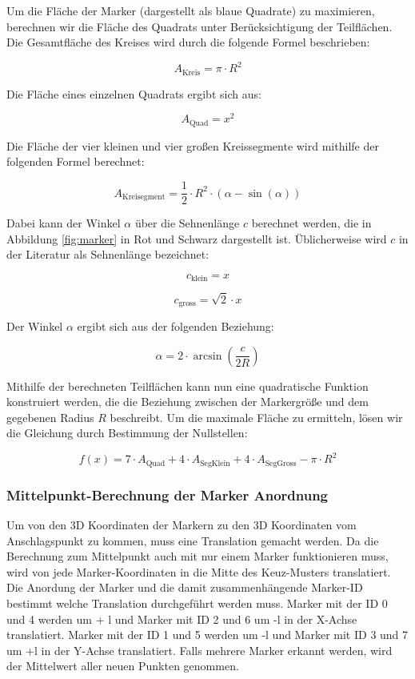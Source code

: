 Um die Fläche der Marker (dargestellt als blaue Quadrate) zu maximieren, berechnen wir die Fläche des Quadrats unter Berücksichtigung der Teilflächen. Die Gesamtfläche des Kreises wird durch die folgende Formel beschrieben:

\[
A_\text{Kreis} = \pi \cdot R^2
\]

Die Fläche eines einzelnen Quadrats ergibt sich aus:

\[
A_{\text{Quad}} = x^2
\]

Die Fläche der vier kleinen und vier großen Kreissegmente wird mithilfe der folgenden Formel berechnet:

\[
A_\text{Kreisegment} = \frac{1}{2} \cdot R^2 \cdot (\alpha - \sin(\alpha))
\]

Dabei kann der Winkel \(\alpha\) über die Sehnenlänge \(c\) berechnet werden, die in Abbildung \ref{fig:marker} in Rot und Schwarz dargestellt ist. Üblicherweise wird \(c\) in der Literatur als Sehnenlänge bezeichnet:

\[
c_\text{klein} = x
\]

\[
c_\text{gross} = \sqrt{2} \cdot x
\]

Der Winkel \(\alpha\) ergibt sich aus der folgenden Beziehung:

\[
\alpha = 2 \cdot \arcsin\left(\frac{c}{2R}\right)
\]

Mithilfe der berechneten Teilflächen kann nun eine quadratische Funktion konstruiert werden, die die Beziehung zwischen der Markergröße und dem gegebenen Radius \(R\) beschreibt. Um die maximale Fläche zu ermitteln, lösen wir die Gleichung durch Bestimmung der Nullstellen:

\[
f(x) = 7 \cdot A_\text{Quad} + 4 \cdot A_\text{SegKlein} + 4 \cdot A_\text{SegGross} - \pi \cdot R^2
\]


\subsubsection{Mittelpunkt-Berechnung der Marker Anordnung}

Um von den 3D Koordinaten der Markern zu den 3D Koordinaten vom Anschlagspunkt zu kommen, muss eine Translation gemacht werden. Da die Berechnung zum Mittelpunkt auch mit nur einem Marker funktionieren muss, wird von jede Marker-Koordinaten in die Mitte des Keuz-Musters translatiert. Die Anordung der Marker und die damit zusammenhängende Marker-ID bestimmt welche Translation durchgeführt werden muss. Marker mit der ID 0 und 4 werden um + l und Marker mit ID 2 und 6 um -l in der X-Achse translatiert. Marker mit der ID 1 und 5 werden um -l und Marker mit ID 3 und 7 um +l in der Y-Achse translatiert. Falls mehrere Marker erkannt werden, wird der Mittelwert aller neuen Punkten genommen.


